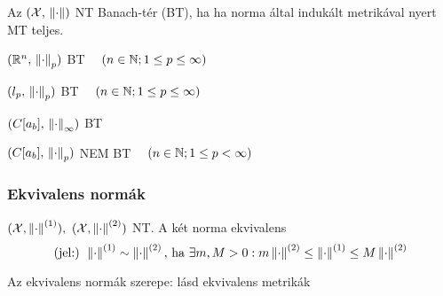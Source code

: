 \begin{de}
  Az $\NT$ NT Banach-tér (BT), ha ha norma által indukált metrikával nyert MT teljes.
\end{de}
\begin{Pl}
\item $(\R^n,\,\Norma_p)$ BT $\quad(n\in\N; 1\leq p\leq \infty)$
\item $(l_p,\,\Norma_p)$ BT $\quad(n\in\N; 1\leq p\leq \infty)$
\item $(C[a_b],\,\Norma_\infty)$ BT 
\item $(C[a_b],\,\Norma_p)$ NEM BT $\quad(n\in\N; 1\leq p< \infty)$
\end{Pl}

\subsubsection{Ekvivalens normák}
\begin{de}
  $(\X,\Norman1),\ (\X,\Norman2)$ NT. A két norma ekvivalens 
  \[ \text{(jel:) } \Norman1\sim\Norman2\text{, ha }\exists m,M>0:m\Norman2\leq \Norman1\leq M\Norman2\]    
\end{de}
\begin{megj}
  Az ekvivalens normák szerepe: lásd ekvivalens metrikák
\end{megj}


